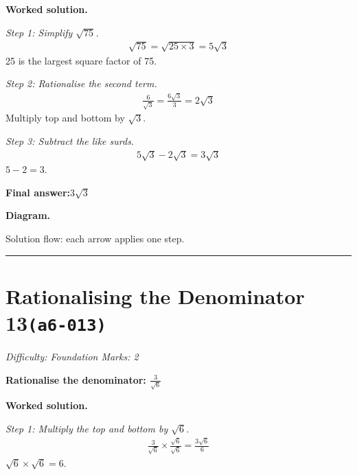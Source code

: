 \documentclass[11pt]{article}
\newcommand{\question}[1]{\par\medskip\noindent\textbf{#1}\par}
\begin{document}
\textbf{Worked solution.}

\textit{Step 1: Simplify \( \sqrt{75} \).}
\[\begin{gathered}
\sqrt{75} = \sqrt{25 \times 3} = 5\sqrt{3}
\end{gathered}\]
25 is the largest square factor of 75.

\textit{Step 2: Rationalise the second term.}
\[\begin{gathered}
\frac{6}{\sqrt{3}} = \frac{6\sqrt{3}}{3} = 2\sqrt{3}
\end{gathered}\]
Multiply top and bottom by \( \sqrt{3} \).

\textit{Step 3: Subtract the like surds.}
\[\begin{gathered}
5\sqrt{3} - 2\sqrt{3} = 3\sqrt{3}
\end{gathered}\]
\( 5 - 2 = 3 \).

\begin{answerbox}
\textbf{Final answer:}\quad \(\displaystyle 3\sqrt{3}\)
\end{answerbox}
\textbf{Diagram.}

\begin{center}
\end{center}
\small Solution flow: each arrow applies one step.\normalsize

\medskip\hrule

\section*{Rationalising the Denominator 13\quad\small\texttt{(a6-013)}}
\textit{Difficulty: Foundation \quad\textbar\quad Marks: 2}

\question{Rationalise the denominator: \( \frac{3}{\sqrt{6}} \)}

\textbf{Worked solution.}

\textit{Step 1: Multiply the top and bottom by \( \sqrt{6} \).}
\[\begin{gathered}
\frac{3}{\sqrt{6}} \times \frac{\sqrt{6}}{\sqrt{6}} = \frac{3\sqrt{6}}{6}
\end{gathered}\]
\( \sqrt{6} \times \sqrt{6} = 6 \).
\end{document}
